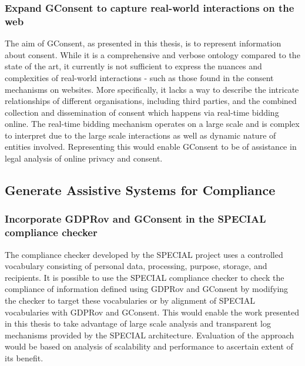 \subsubsection{Expand GConsent to capture real-world interactions on the web}
The aim of GConsent, as presented in this thesis, is to represent information about consent. While it is a comprehensive and verbose ontology compared to the state of the art, it currently is not sufficient to express the nuances and complexities of real-world interactions - such as those found in the consent mechanisms on websites. More specifically, it lacks a way to describe the intricate relationships of different organisations, including third parties, and the combined collection and dissemination of consent which happens via real-time bidding online. The real-time bidding mechanism operates on a large scale and is complex to interpret \cite{eijk_web_2019} due to the large scale interactions as well as dynamic nature of entities involved. Representing this would enable GConsent to be of assistance in legal analysis of online privacy and consent.

\subsection*{Generate Assistive Systems for Compliance}
\subsubsection{Incorporate GDPRov and GConsent in the SPECIAL compliance checker}
The compliance checker developed by the SPECIAL project \cite{kirrane_scalable_2018} uses a controlled vocabulary consisting of personal data, processing, purpose, storage, and recipients. It is possible to use the SPECIAL compliance checker to check the compliance of information defined using GDPRov and GConsent by modifying the checker to target these vocabularies or by alignment of SPECIAL vocabularies with GDPRov and GConsent. This would enable the work presented in this thesis to take advantage of large scale analysis and transparent log mechanisms provided by the SPECIAL architecture. Evaluation of the approach would be based on analysis of scalability and performance to ascertain extent of its benefit.

